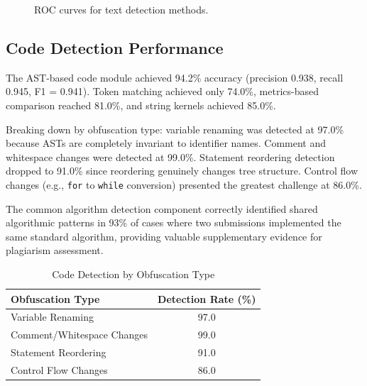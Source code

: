 \documentclass[10pt,twocolumn]{article}
\begin{document}
\begin{figure}[htbp]
\centering
\vspace{4cm}
\caption{ROC curves for text detection methods.}
\label{fig:roc_text}
\end{figure}

\subsection{Code Detection Performance}

The AST-based code module achieved 94.2\% accuracy (precision 0.938, recall 0.945, F1 = 0.941). Token matching achieved only 74.0\%, metrics-based comparison reached 81.0\%, and string kernels achieved 85.0\%.

Breaking down by obfuscation type: variable renaming was detected at 97.0\% because ASTs are completely invariant to identifier names. Comment and whitespace changes were detected at 99.0\%. Statement reordering detection dropped to 91.0\% since reordering genuinely changes tree structure. Control flow changes (e.g., \texttt{for} to \texttt{while} conversion) presented the greatest challenge at 86.0\%.

The common algorithm detection component correctly identified shared algorithmic patterns in 93\% of cases where two submissions implemented the same standard algorithm, providing valuable supplementary evidence for plagiarism assessment.

\begin{table}[htbp]
\caption{Code Detection by Obfuscation Type}
\centering
\small
\begin{tabular}{lc}
\toprule
\textbf{Obfuscation Type} & \textbf{Detection Rate (\%)} \\
\midrule
Variable Renaming & 97.0 \\
Comment/Whitespace Changes & 99.0 \\
Statement Reordering & 91.0 \\
Control Flow Changes & 86.0 \\
\bottomrule
\end{tabular}
\label{tab:code}
\end{table}
\end{document}
